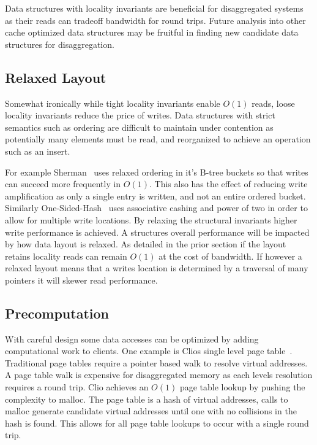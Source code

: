 Data structures with locality invariants are beneficial for disaggregated
systems as their reads can tradeoff bandwidth for round trips. Future
analysis into other cache optimized data structures may be fruitful in finding
new candidate data structures for disaggregation.

\subsection{Relaxed Layout} 

Somewhat ironically while tight locality invariants enable $O(1)$ reads, loose
locality invariants reduce the price of writes. Data structures with strict
semantics such as ordering are difficult to maintain under contention as
potentially many elements must be read, and reorganized to achieve an operation
such as an insert.

For example Sherman~\cite{sherman} uses relaxed ordering in it's B-tree buckets
so that writes can succeed more frequently in $O(1)$. This also has the effect
of reducing write amplification as only a single entry is written, and not an
entire ordered bucket. Similarly One-Sided-Hash~\cite{one-sided-hash} uses
associative cashing and power of two in order to allow for multiple write
locations. By relaxing the structural invariants higher write performance is
achieved. A structures overall performance will be impacted by how data layout
is relaxed. As detailed in the prior section if the layout retains locality
reads can remain $O(1)$ at the cost of bandwidth. If however a relaxed layout
means that a writes location is determined by a traversal of many pointers it
will skewer read performance.


\subsection{Precomputation} 

With careful design some data accesses can be optimized by adding computational
work to clients. One example is Clios single level page table~\cite{clio}.
Traditional page tables require a pointer based walk to resolve virtual
addresses. A page table walk is expensive for disaggregated memory as each
levels resolution requires a round trip. Clio achieves an $O(1)$ page table
lookup by pushing the complexity to malloc. The page table is a hash of virtual
addresses, calls to malloc generate candidate virtual addresses until one with
no collisions in the hash is found. This allows for all page table lookups to
occur with a single round trip.

